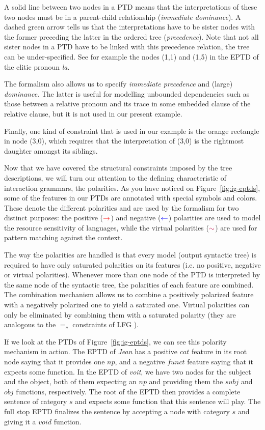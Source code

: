 A solid line between two nodes in a PTD means that the interpretations
of these two nodes must be in a parent-child relationship
(\emph{immediate dominance}). A dashed green arrow tells us that the
interpretations have to be sister nodes with the former preceding the
latter in the ordered tree (\emph{precedence}). Note that not all sister
nodes in a PTD have to be linked with this precedence relation, the tree
can be under-specified. See for example the nodes (1,1) and (1,5) in the
EPTD of the clitic pronoun \emph{la}.

The formalism also allows us to specify \emph{immediate precedence} and
(large) \emph{dominance}. The latter is useful for modelling unbounded
dependencies such as those between a relative pronoun and its trace in
some embedded clause of the relative clause, but it is not used in our
present example.

Finally, one kind of constraint that is used in our example is the
orange rectangle in node (3,0), which requires that the interpretation
of (3,0) is the rightmost daughter amongst its siblings.

Now that we have covered the structural constraints imposed by the tree
descriptions, we will turn our attention to the defining characteristic
of interaction grammars, the polarities. As you have noticed on
Figure~\ref{fig:ig-eptds}, some of the features in our PTDs are
annotated with special symbols and colors. These denote the different
polarities and are used by the formalism for two distinct purposes: the
positive ($\textcolor{red}{\rightarrow}$) and negative
($\textcolor{blue}{\leftarrow}$) polarities are used to model the
resource sensitivity of languages, while the virtual polarities
($\textcolor{purple}{\sim}$) are used for pattern matching against the
context.

The way the polarities are handled is that every model (output syntactic
tree) is required to have only saturated polarities on its features
(i.e. no positive, negative or virtual polarities). Whenever more than
one node of the PTD is interpreted by the same node of the syntactic
tree, the polarities of each feature are combined. The combination
mechanism allows us to combine a positively polarized feature with a
negatively polarized one to yield a saturated one. Virtual polarities
can only be eliminated by combining them with a saturated polarity (they
are analogous to the $=_{c}$ constraints of LFG
\cite{kaplan1982lexical}).

If we look at the PTDs of Figure~\ref{fig:ig-eptds}, we can see this
polarity mechanism in action. The EPTD of \emph{Jean} has a positive
$cat$ feature in its root node saying that it provides one $np$, and a
negative $funct$ feature saying that it expects some function. In the
EPTD of \emph{voit}, we have two nodes for the subject and the object,
both of them expecting an $np$ and providing them the $subj$ and $obj$
functions, respectively. The root of the EPTD then provides a complete
sentence of category $s$ and expects some function that this sentence
will play. The full stop EPTD finalizes the sentence by accepting a node
with category $s$ and giving it a $void$ function.

